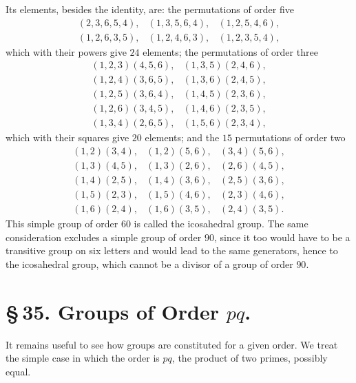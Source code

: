 \documentclass[11pt]{article}
\begin{document}
Its elements, besides the identity, are: the permutations of order five
\[
\begin{array}{lll}
(2,3,6,5,4),&(1,3,5,6,4),&(1,2,5,4,6),\\
(1,2,6,3,5),&(1,2,4,6,3),&(1,2,3,5,4),
\end{array}
\]
which with their powers give $24$ elements; the permutations of order three
\[
\begin{array}{ll}
(1,2,3)(4,5,6),&(1,3,5)(2,4,6),\\
(1,2,4)(3,6,5),&(1,3,6)(2,4,5),\\
(1,2,5)(3,6,4),&(1,4,5)(2,3,6),\\
(1,2,6)(3,4,5),&(1,4,6)(2,3,5),\\
(1,3,4)(2,6,5),&(1,5,6)(2,3,4),
\end{array}
\]
which with their squares give $20$ elements; and the $15$ permutations of order two
\[
\begin{array}{lll}
(1,2)(3,4),&(1,2)(5,6),&(3,4)(5,6),\\
(1,3)(4,5),&(1,3)(2,6),&(2,6)(4,5),\\
(1,4)(2,5),&(1,4)(3,6),&(2,5)(3,6),\\
(1,5)(2,3),&(1,5)(4,6),&(2,3)(4,6),\\
(1,6)(2,4),&(1,6)(3,5),&(2,4)(3,5).
\end{array}
\]
This simple group of order $60$ is called the icosahedral group. The same consideration excludes a simple group of order $90$, since it too would have to be a transitive group on six letters and would lead to the same generators, hence to the icosahedral group, which cannot be a divisor of a group of order $90$.

\section*{\S\,35. Groups of Order $pq$.}

It remains useful to see how groups are constituted for a given order. We treat the simple case in which the order is $pq$, the product of two primes, possibly equal.
\end{document}
